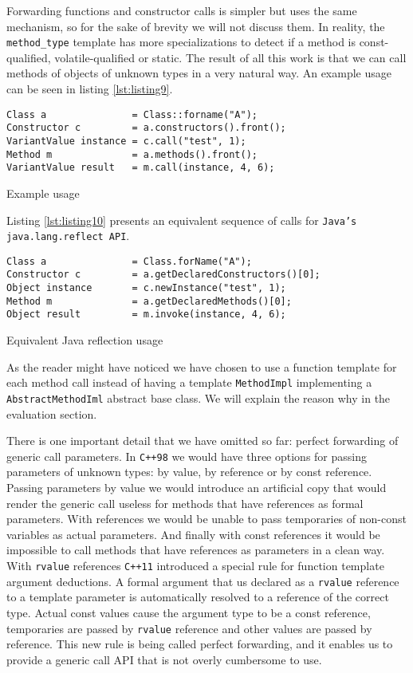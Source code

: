 Forwarding functions and constructor calls is simpler but uses the same mechanism, so for the sake of brevity we will not discuss them.
In reality, the \texttt{method\_type} template has more specializations to detect if a method is const-qualified, volatile-qualified or static.
The result of all this work is that we can call methods of objects of unknown types in a very natural way. An example usage can be seen in listing
\ref{lst:listing9}.


\begin{listing}[H]
\begin{verbatim}
Class a               = Class::forname("A");
Constructor c         = a.constructors().front();
VariantValue instance = c.call("test", 1);
Method m              = a.methods().front();
VariantValue result   = m.call(instance, 4, 6);
\end{verbatim}
\caption{Example usage}
\label{lst:listing9}
\end{listing}

Listing \ref{lst:listing10} presents an equivalent sequence of calls for \texttt{Java's java.lang.reflect API}.


\begin{listing}[H]
\begin{verbatim}
Class a               = Class.forName("A");
Constructor c         = a.getDeclaredConstructors()[0];
Object instance       = c.newInstance("test", 1);
Method m              = a.getDeclaredMethods()[0];
Object result         = m.invoke(instance, 4, 6);
\end{verbatim}
\caption{Equivalent Java reflection usage}
\label{lst:listing10}
\end{listing}

As the reader might have noticed we have chosen to use a function template for each method call instead of having a template \texttt{MethodImpl}
implementing a \texttt{AbstractMethodIml} abstract base class. We will explain the reason why in the evaluation section.

There is one important detail that we have omitted so far: perfect forwarding of generic call parameters. In \texttt{C++98}
we would have three options for passing parameters of unknown types: by value, by reference or by const reference. Passing
parameters by value we would introduce an artificial copy that would render the generic call useless for methods that
have references as formal parameters. With references we would be unable to pass temporaries of non-const variables as
actual parameters. And finally with const references it would be impossible to call methods that have references as parameters
in a clean way. With \texttt{rvalue} references \texttt{C++11} introduced a special rule for function template argument deductions.
A formal argument that us declared as a \texttt{rvalue} reference to a template parameter is automatically resolved to a reference
of the correct type. Actual const values cause the argument type to be a const reference, temporaries are passed by \texttt{rvalue}
reference and other values are passed by reference. This new rule is being called perfect forwarding, and it enables us to
provide a generic call API that is not overly cumbersome to use.

